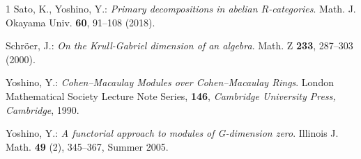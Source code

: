 \documentclass[11pt]{amsart}
\theoremstyle{definition}
\numberwithin{equation}{section}
\begin{document}
\begin{thebibliography}{1}
{\sc Sato, K.}, {\sc Yoshino, Y.}: 
{\it Primary decompositions in abelian $R$-categories}. 
Math. J. Okayama Univ. {\bf 60}, 91--108  (2018). 

{\sc Schr\"oer, J.}: 
{\it On the Krull-Gabriel dimension of an algebra}. 
Math. Z {\bf 233}, 287--303 (2000). 

{\sc Yoshino, Y.}: 
{\it Cohen--Macaulay Modules over Cohen--Macaulay Rings}. 
London Mathematical Society Lecture Note Series, {\bf 146}, {\em Cambridge University Press, Cambridge}, 1990. 


{\sc Yoshino, Y.}: 
{\it A functorial approach to modules of G-dimension zero}. 
Illinois J. Math. {\bf 49} (2), 345--367, Summer 2005. 
 
\end{thebibliography} 
\end{document}
